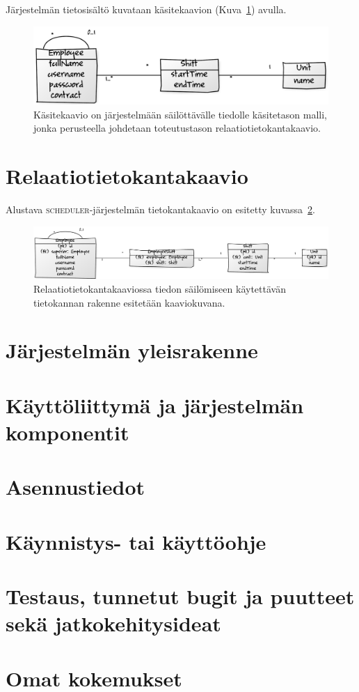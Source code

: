 \documentclass[10pt,titlepage,hidelinks]{scrartcl}
\newcommand{\scheduler}{\textsc{scheduler}}
\begin{document}
Järjestelmän tietosisältö kuvataan käsitekaavion (Kuva~\ref{fig:kasitekaavio}) avulla.

\begin{figure}[tb]
\centering
\includegraphics[width=.5\textwidth]{e85adf45}
\caption{Käsitekaavio on järjestelmään säilöttävälle tiedolle käsitetason malli, jonka perusteella johdetaan toteutustason relaatiotietokantakaavio.}
\label{fig:kasitekaavio}
\end{figure}

\section{Relaatiotietokantakaavio}

Alustava \scheduler{}-järjestelmän tietokantakaavio on esitetty kuvassa~\ref{fig:tietokantakaavio}.

\begin{figure}[tb]
\centering
\includegraphics[width=\textwidth]{af410d18}
\caption{Relaatiotietokantakaaviossa tiedon säilömiseen käytettävän tietokannan rakenne esitetään kaaviokuvana.}
\label{fig:tietokantakaavio}
\end{figure}

\section{Järjestelmän yleisrakenne}
\section{Käyttöliittymä ja järjestelmän komponentit}
\section{Asennustiedot}
\section{Käynnistys- tai käyttöohje}
\section{Testaus, tunnetut bugit ja puutteet sekä jatkokehitysideat}
\section{Omat kokemukset}
\end{document}
